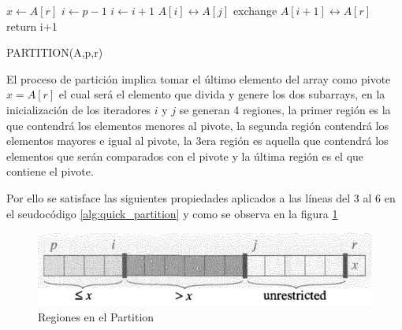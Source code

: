 \documentclass{article}
\begin{document}
                    \begin{algorithm}[H]
                        \begin{algorithmic}[1]
                            \STATE $x \leftarrow A[r]$
                            \STATE $i \leftarrow p-1$
                                    \STATE $i \leftarrow i+1$
                                    \STATE $A[i] \leftrightarrow A[j]$
                                \ENDIF
                            \ENDFOR
                            \STATE exchange $A[i+1] \leftrightarrow A[r]$
                            \STATE return i+1
                        \end{algorithmic}
                        \caption{PARTITION(A,p,r)}
                        \label{alg:quick_partition}
                    \end{algorithm}
                    
                    El proceso de partici\'{o}n implica tomar el \'{u}ltimo elemento del array como pivote $x = A[r]$ el cual ser\'{a} el elemento que divida y genere los dos subarrays, en la inicializaci\'{o}n de los iteradores $i$ y $j$ se generan 4 regiones, la primer regi\'{o}n es la que contendrá los elementos menores al pivote, la segunda regi\'{o}n contendrá los elementos mayores e igual al pivote, la 3era regi\'{o}n es aquella que contendrá los elementos que serán comparados con el pivote y la \'{u}ltima regi\'{o}n es el que contiene el pivote.
                    
                    Por ello se satisface las siguientes propiedades aplicados a las l\'{i}neas del 3 al 6 en el seudoc\'{o}digo \ref{alg:quick_partition} y como se observa en la figura \ref{fig:quicksort_regions}
                    
                    \begin{figure}[H]
                        \centering
                        \includegraphics[scale=0.30]{img/quicksort_regions.png}
                		\caption{Regiones en el Partition}
                		\label{fig:quicksort_regions}
                	\end{figure}
                    
\end{document}
